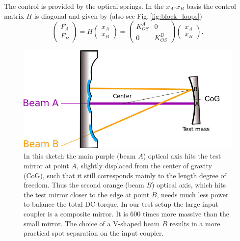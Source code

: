 The control is provided by the optical springs. In the $x_A$-$x_B$ basis the control matrix $H$ is diagonal and given by  (also see Fig.\,\ref{fig:block_loops})
\begin{equation}
\begin{pmatrix}
F_{A}\\ F_{B}
\end{pmatrix}
= H
 \begin{pmatrix}
x_A\\ x_B
\end{pmatrix} 
=  \begin{pmatrix}
K_{OS}^A & 0 \\ 0 & K_{OS}^B
\end{pmatrix} 
 \begin{pmatrix}
x_A\\ x_B
\end{pmatrix}. 
\label{eq:HX}
\end{equation}

\begin{figure}[t]
	\centering
		\includegraphics[width=.7\textwidth]{figures/theory/trap_drawing_paper3.pdf}
	\caption[Trap drawing]{
	In this sketch the main purple (beam $A$) optical axis hits the test mirror %
	at point $A$, slightly displaced from the center of gravity (CoG), such
	 that it still corresponds mainly to the length degree of freedom. Thus the second orange (beam $B$) optical axis, which hits the test mirror closer to the edge at point $B$, needs much less power to balance the total DC torque. In our test setup the large input coupler is a composite mirror. It is 600 times more massive than the small mirror. The choice of a V-shaped beam $B$ results in a more practical spot separation on the input coupler. }	

	\label{fig:angular}
\end{figure}



